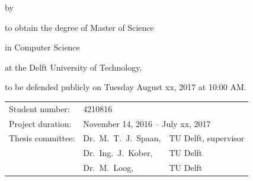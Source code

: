 \begin{titlepage}


\begin{center}


{\makeatletter
\largetitlestyle\fontsize{28}{94}\selectfont\@title										%
\makeatother}

{\makeatletter
\ifx\@subtitle\undefined\else
    \bigskip
   {\tudsffamily\fontsize{22}{32}\selectfont\@subtitle}    
\fi
\makeatother}

%
%

%
%
%
%
%
%
%
%
%
%
%
%
%
%
%
%


\bigskip
\bigskip

by

\bigskip
\bigskip

{\makeatletter
\largetitlestyle\fontsize{20}{26}\selectfont\@author
\makeatother}

\bigskip
\bigskip

to obtain the degree of Master of Science 

in Computer Science

at the Delft University of Technology,

to be defended publicly on Tuesday August xx, 2017 at 10:00 AM.

\vfill

\begin{tabular}{lll}
    Student number: & 4210816 \\
    Project duration: & \multicolumn{2}{l}{November 14, 2016 -- July xx, 2017} \\
    Thesis committee: & Dr.\ M.\ T.\ J.\ Spaan, & TU Delft, supervisor \\
        & Dr.\ Ing.\ J.\ Kober, & TU Delft \\												%
        & Dr.\ M.\ Loog, & TU Delft 											%
\end{tabular}


\end{center}
\end{titlepage}
